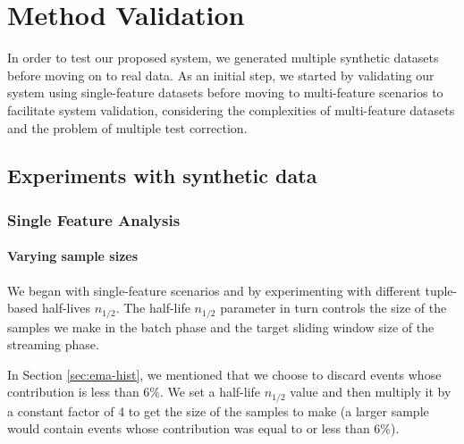 \chapter{Method Validation} \label{chap:validation} \minitoc

In order to test our proposed system, we generated multiple synthetic datasets before moving on to real data. As an initial step, we started by validating our system using single-feature datasets before moving to multi-feature scenarios to facilitate system validation, considering the complexities of multi-feature datasets and the problem of multiple test correction.


\section{Experiments with synthetic data}
\subsection{Single Feature Analysis}

\subsubsection{Varying sample sizes}
We began with single-feature scenarios and by experimenting with different tuple-based half-lives $n_{1/2}$. The half-life $n_{1/2}$ parameter in turn controls the size of the samples we make in the batch phase and the target sliding window size of the streaming phase. 

In Section \ref{sec:ema-hist}, we mentioned that we choose to discard events whose contribution is less than 6\%. We set a half-life $n_{1/2}$ value and then multiply it by a constant factor of 4 to get the size of the samples to make (a larger sample would contain events whose contribution was equal to or less than 6\%). 

